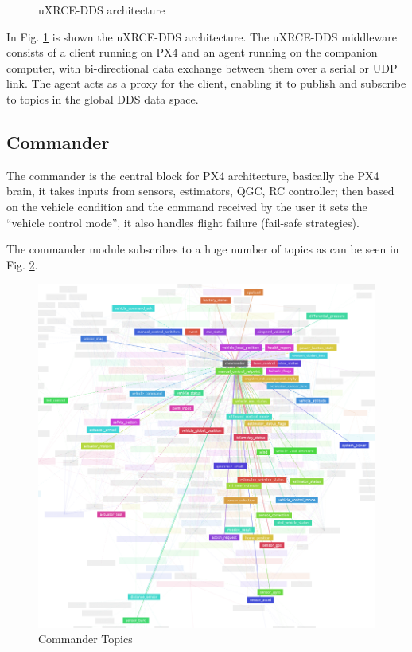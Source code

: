 \documentclass[journal]{IEEEtran}
\begin{document}
\begin{figure}
    \centering
    
    \caption{uXRCE-DDS architecture}
    \label{fig:uXRCE-DDS}
\end{figure}

In Fig. \ref{fig:uXRCE-DDS} is shown the uXRCE-DDS architecture. The uXRCE-DDS middleware consists of a client running on PX4 and an agent running on the companion computer, with bi-directional data exchange between them over a serial or UDP link. The agent acts as a proxy for the client, enabling it to publish and subscribe to topics in the global DDS data space.

\subsection{Commander}

The commander is the central block for PX4 architecture, basically the PX4 brain, it takes inputs from sensors, estimators, QGC, RC controller; then based on the vehicle condition and the command received by the user it sets the “vehicle control mode”, it also handles flight failure (fail-safe strategies). 

The commander module subscribes to a huge number of topics as can be seen in Fig. \ref{fig:uorb_graph}.

\begin{figure}
    \centering
    \includegraphics[scale=0.25]{Images/uorb_graph.png}
    \caption{Commander Topics}
    \label{fig:uorb_graph}
\end{figure}
\end{document}
